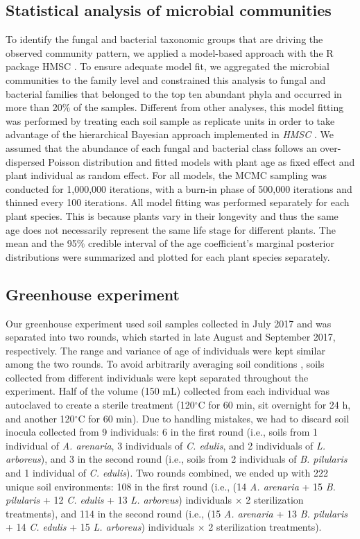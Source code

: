 \subsection{Statistical analysis of microbial communities}
To identify the fungal and bacterial taxonomic groups that are driving the observed community pattern, we applied a model-based approach with the R package HMSC \citep{Ovaskainen2017}. 
To ensure adequate model fit, we aggregated the microbial communities to the family level and constrained this analysis to fungal and bacterial families that belonged to the top ten abundant phyla and occurred in more than 20$\%$ of the samples. 
Different from other analyses, this model fitting was performed by treating each soil sample as replicate units in order to take advantage of the hierarchical Bayesian approach implemented in \textit{HMSC} \citep{Ovaskainen2017}. 
We assumed that the abundance of each fungal and bacterial class follows an over-dispersed Poisson distribution and fitted models with plant age as fixed effect and plant individual as random effect. 
For all models, the MCMC sampling was conducted for 1,000,000 iterations, with a burn-in phase of 500,000 iterations and thinned every 100 iterations.
All model fitting was performed separately for each plant species. This is because plants vary in their longevity and thus the same age does not necessarily represent the same life stage for different plants.
The mean and the 95$\%$ credible interval of the age coefficient's marginal posterior distributions were summarized and plotted for each plant species separately.
\par


\subsection{Greenhouse experiment}
Our greenhouse experiment used soil samples collected in July 2017 and was separated into two rounds, which started in late August and September 2017, respectively. The range and variance of age of individuals were kept similar among the two rounds. To avoid arbitrarily averaging soil conditions \citep{Rinella2018}, soils collected from different individuals were kept separated throughout the experiment. Half of the volume (150 mL) collected from each individual was autoclaved to create a sterile treatment (120$^\circ$C for 60 min, sit overnight for 24 h, and another 120$^\circ$C for 60 min). Due to handling mistakes, we had to discard soil inocula collected from 9 individuals: 6 in the first round (i.e., soils from 1 individual of \textit{A. arenaria}, 3 individuals of \textit{C. edulis}, and 2 individuals of \textit{L. arboreus}), and 3 in the second round (i.e., soils from 2 individuals of \textit{B. pilularis} and 1 individual of \textit{C. edulis}). Two rounds combined, we ended up with 222 unique soil environments: 108 in the first round (i.e., (14 \textit{A. arenaria} + 15 \textit{B. pilularis} + 12 \textit{C. edulis} + 13 \textit{L. arboreus}) individuals $\times$ 2 sterilization treatments), and 114 in the second round (i.e., (15 \textit{A. arenaria} + 13 \textit{B. pilularis} + 14 \textit{C. edulis} + 15 \textit{L. arboreus}) individuals $\times$ 2 sterilization treatments).
\par


